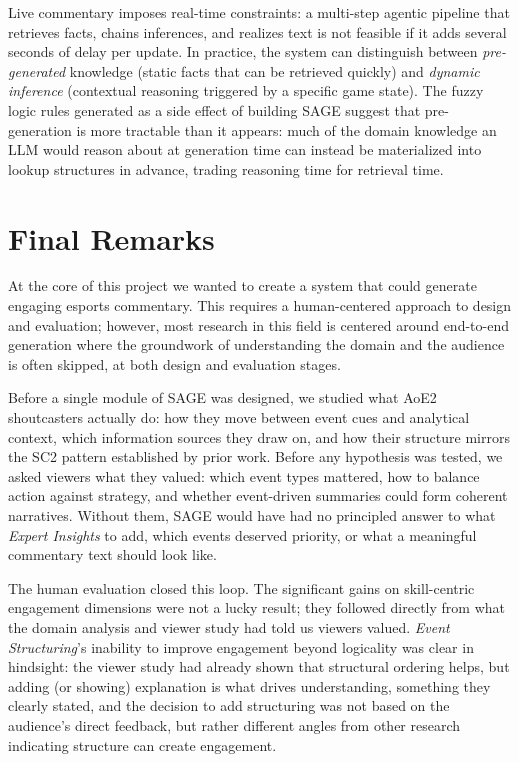 Live commentary imposes real-time constraints: a multi-step agentic pipeline that retrieves facts, chains inferences, and realizes text is not feasible if it adds several seconds of delay per update. In practice, the system can distinguish between \textit{pre-generated} knowledge (static facts that can be retrieved quickly) and \textit{dynamic inference} (contextual reasoning triggered by a specific game state). The fuzzy logic rules generated as a side effect of building SAGE suggest that pre-generation is more tractable than it appears: much of the domain knowledge an LLM would reason about at generation time can instead be materialized into lookup structures in advance, trading reasoning time for retrieval time.

\section{Final Remarks}
At the core of this project we wanted to create a system that could generate engaging esports commentary. This requires a human-centered approach to design and evaluation; however, most research in this field is centered around end-to-end generation where the groundwork of understanding the domain and the audience is often skipped, at both design and evaluation stages.

Before a single module of SAGE was designed, we studied what AoE2 shoutcasters actually do: how they move between event cues and analytical context, which information sources they draw on, and how their structure mirrors the SC2 pattern established by prior work. Before any hypothesis was tested, we asked viewers what they valued: which event types mattered, how to balance action against strategy, and whether event-driven summaries could form coherent narratives. Without them, SAGE would have had no principled answer to what \textit{Expert Insights} to add, which events deserved priority, or what a meaningful commentary text should look like.

The human evaluation closed this loop. The significant gains on skill-centric engagement dimensions were not a lucky result; they followed directly from what the domain analysis and viewer study had told us viewers valued. \textit{Event Structuring}'s inability to improve engagement beyond logicality was clear in hindsight: the viewer study had already shown that structural ordering helps, but adding (or showing) explanation is what drives understanding, something they clearly stated, and the decision to add structuring was not based on the audience's direct feedback, but rather different angles from other research indicating structure can create engagement.

